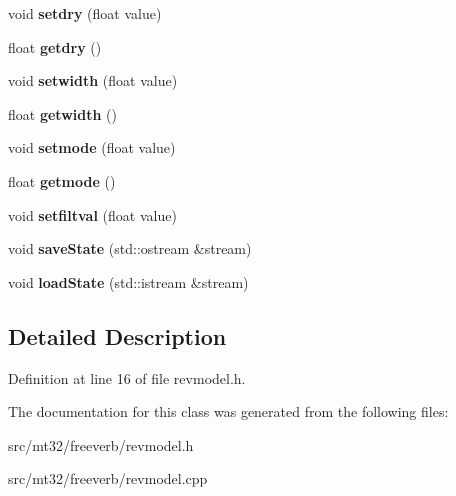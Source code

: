 \begin{DoxyCompactItemize}
\item 
\hypertarget{classrevmodel_a260e661feb337cbb034c7888bb70dfd0}{void {\bfseries setdry} (float value)}\label{classrevmodel_a260e661feb337cbb034c7888bb70dfd0}

\item 
\hypertarget{classrevmodel_a45e7883001a56414dfe9ec787e3f1529}{float {\bfseries getdry} ()}\label{classrevmodel_a45e7883001a56414dfe9ec787e3f1529}

\item 
\hypertarget{classrevmodel_a87672a6d05d30977633562f909e3c259}{void {\bfseries setwidth} (float value)}\label{classrevmodel_a87672a6d05d30977633562f909e3c259}

\item 
\hypertarget{classrevmodel_ac98d26e165bde52c0bb962e4bca4f950}{float {\bfseries getwidth} ()}\label{classrevmodel_ac98d26e165bde52c0bb962e4bca4f950}

\item 
\hypertarget{classrevmodel_a294243594f4802f4f98edfd3cd106e0b}{void {\bfseries setmode} (float value)}\label{classrevmodel_a294243594f4802f4f98edfd3cd106e0b}

\item 
\hypertarget{classrevmodel_a680df826bb6a1aea3d0e8a4259a2cc83}{float {\bfseries getmode} ()}\label{classrevmodel_a680df826bb6a1aea3d0e8a4259a2cc83}

\item 
\hypertarget{classrevmodel_a2b675bb2a078e0ff3dd0de092c8f55c0}{void {\bfseries setfiltval} (float value)}\label{classrevmodel_a2b675bb2a078e0ff3dd0de092c8f55c0}

\item 
\hypertarget{classrevmodel_a03a498c241965b7853d0a837265876de}{void {\bfseries save\-State} (std\-::ostream \&stream)}\label{classrevmodel_a03a498c241965b7853d0a837265876de}

\item 
\hypertarget{classrevmodel_a467404424454cf08ac5b611e70fceadd}{void {\bfseries load\-State} (std\-::istream \&stream)}\label{classrevmodel_a467404424454cf08ac5b611e70fceadd}

\end{DoxyCompactItemize}


\subsection{Detailed Description}


Definition at line 16 of file revmodel.\-h.



The documentation for this class was generated from the following files\-:\begin{DoxyCompactItemize}
\item 
src/mt32/freeverb/revmodel.\-h\item 
src/mt32/freeverb/revmodel.\-cpp\end{DoxyCompactItemize}
